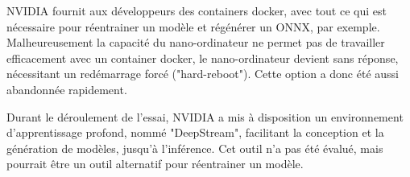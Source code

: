 \par NVIDIA fournit aux développeurs des containers docker, avec tout ce qui est nécessaire pour réentrainer un modèle et régénérer un ONNX, par exemple. Malheureusement la capacité du nano-ordinateur ne permet pas de travailler efficacement avec un container docker, le nano-ordinateur devient sans réponse, nécessitant un redémarrage forcé ("hard-reboot"). Cette option a donc été aussi abandonnée rapidement. 
\par Durant le déroulement de l'essai, NVIDIA a mis à disposition un environnement d'apprentissage profond, nommé "DeepStream", facilitant la conception et la génération de modèles, jusqu'à l'inférence. Cet outil n'a pas été évalué, mais pourrait être un outil alternatif pour réentrainer un modèle.